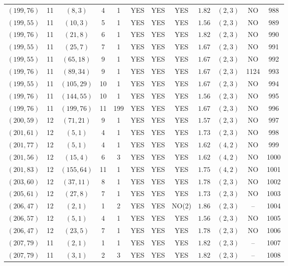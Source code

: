 \begin{longtable}{|c|c|c|c|c|c|c|c|c|c|c|c|}
$(199,76)$ & 11 & $(8,3)$ & 4 & 1 & YES & YES & YES & $1.82$ & $(2,3)$ & NO & 988\\
$(199,55)$ & 11 & $(10,3)$ & 5 & 1 & YES & YES & YES & $1.56$ & $(2,3)$ & NO & 989\\
$(199,76)$ & 11 & $(21,8)$ & 6 & 1 & YES & YES & YES & $1.82$ & $(2,3)$ & NO & 990\\
$(199,55)$ & 11 & $(25,7)$ & 7 & 1 & YES & YES & YES & $1.67$ & $(2,3)$ & NO & 991\\
$(199,55)$ & 11 & $(65,18)$ & 9 & 1 & YES & YES & YES & $1.67$ & $(2,3)$ & NO & 992\\
$(199,76)$ & 11 & $(89,34)$ & 9 & 1 & YES & YES & YES & $1.67$ & $(2,3)$ & 1124 & 993\\
$(199,55)$ & 11 & $(105,29)$ & 10 & 1 & YES & YES & YES & $1.67$ & $(2,3)$ & NO & 994\\
$(199,76)$ & 11 & $(144,55)$ & 10 & 1 & YES & YES & YES & $1.56$ & $(2,3)$ & NO & 995\\
$(199,76)$ & 11 & $(199,76)$ & 11 & 199 & YES & YES & YES & $1.67$ & $(2,3)$ & NO & 996\\
$(200,59)$ & 12 & $(71,21)$ & 9 & 1 & YES & YES & YES & $1.57$ & $(2,3)$ & NO & 997\\
$(201,61)$ & 12 & $(5,1)$ & 4 & 1 & YES & YES & YES & $1.73$ & $(2,3)$ & NO & 998\\
$(201,77)$ & 12 & $(5,1)$ & 4 & 1 & YES & YES & YES & $1.62$ & $(4,2)$ & NO & 999\\
$(201,56)$ & 12 & $(15,4)$ & 6 & 3 & YES & YES & YES & $1.62$ & $(4,2)$ & NO & 1000\\
$(201,83)$ & 12 & $(155,64)$ & 11 & 1 & YES & YES & YES & $1.75$ & $(4,2)$ & NO & 1001\\
$(203,60)$ & 12 & $(37,11)$ & 8 & 1 & YES & YES & YES & $1.78$ & $(2,3)$ & NO & 1002\\
$(205,61)$ & 12 & $(27,8)$ & 7 & 1 & YES & YES & YES & $1.73$ & $(2,3)$ & NO & 1003\\
$(206,47)$ & 12 & $(2,1)$ & 1 & 2 & YES & YES & NO(2) & $1.86$ & $(2,3)$ & -- & 1004\\
$(206,57)$ & 12 & $(5,1)$ & 4 & 1 & YES & YES & YES & $1.56$ & $(2,3)$ & NO & 1005\\
$(206,47)$ & 12 & $(23,5)$ & 7 & 1 & YES & YES & YES & $1.78$ & $(2,3)$ & NO & 1006\\
$(207,79)$ & 11 & $(2,1)$ & 1 & 1 & YES & YES & YES & $1.82$ & $(2,3)$ & -- & 1007\\
$(207,79)$ & 11 & $(3,1)$ & 2 & 3 & YES & YES & YES & $1.82$ & $(2,3)$ & -- & 1008\\

\end{longtable}
